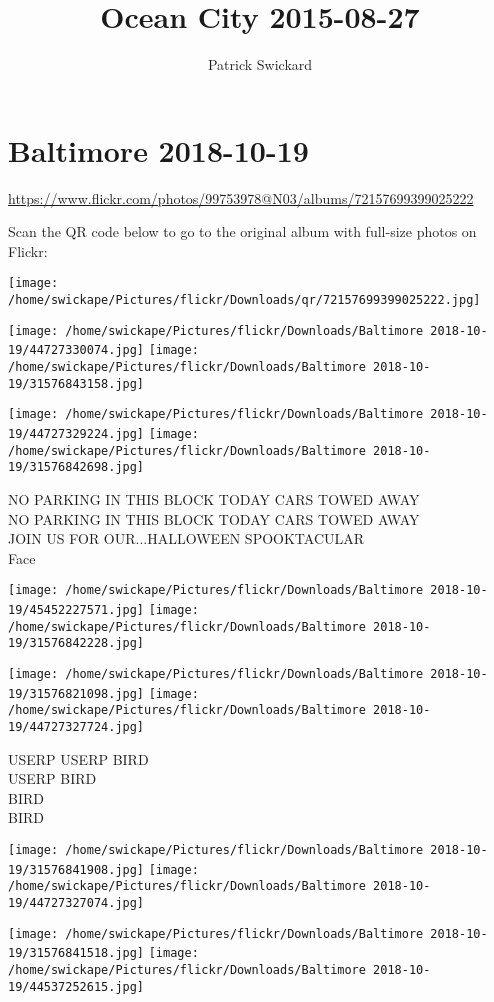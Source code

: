 \documentclass[10pt,letterpaper]{article}
\title{Ocean City 2015-08-27}
\author{Patrick Swickard}
\date{}
\begin{document}
\section*{Baltimore 2018-10-19}

\url{https://www.flickr.com/photos/99753978@N03/albums/72157699399025222}

Scan the QR code below to go to the original album with full-size photos on Flickr:

\texttt{[image: /home/swickape/Pictures/flickr/Downloads/qr/72157699399025222.jpg]}
\pagebreak

\texttt{[image: /home/swickape/Pictures/flickr/Downloads/Baltimore 2018-10-19/44727330074.jpg]}
\texttt{[image: /home/swickape/Pictures/flickr/Downloads/Baltimore 2018-10-19/31576843158.jpg]}

\texttt{[image: /home/swickape/Pictures/flickr/Downloads/Baltimore 2018-10-19/44727329224.jpg]}
\texttt{[image: /home/swickape/Pictures/flickr/Downloads/Baltimore 2018-10-19/31576842698.jpg]}

NO PARKING IN THIS BLOCK TODAY CARS TOWED AWAY\\
NO PARKING IN THIS BLOCK TODAY CARS TOWED AWAY\\
JOIN US FOR OUR...HALLOWEEN SPOOKTACULAR\\
Face
\pagebreak

\texttt{[image: /home/swickape/Pictures/flickr/Downloads/Baltimore 2018-10-19/45452227571.jpg]}
\texttt{[image: /home/swickape/Pictures/flickr/Downloads/Baltimore 2018-10-19/31576842228.jpg]}

\texttt{[image: /home/swickape/Pictures/flickr/Downloads/Baltimore 2018-10-19/31576821098.jpg]}
\texttt{[image: /home/swickape/Pictures/flickr/Downloads/Baltimore 2018-10-19/44727327724.jpg]}

USERP USERP BIRD\\
USERP BIRD\\
BIRD\\
BIRD
\pagebreak

\texttt{[image: /home/swickape/Pictures/flickr/Downloads/Baltimore 2018-10-19/31576841908.jpg]}
\texttt{[image: /home/swickape/Pictures/flickr/Downloads/Baltimore 2018-10-19/44727327074.jpg]}

\texttt{[image: /home/swickape/Pictures/flickr/Downloads/Baltimore 2018-10-19/31576841518.jpg]}
\texttt{[image: /home/swickape/Pictures/flickr/Downloads/Baltimore 2018-10-19/44537252615.jpg]}
\end{document}
